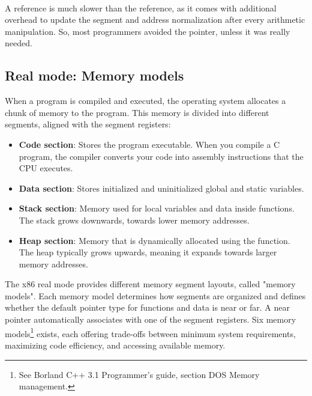 \documentclass[book.tex]{subfiles}
\begin{document}
\\

\par
A  reference is much slower than the  reference, as it comes with additional overhead to update the segment and address normalization after every arithmetic manipulation. So, most programmers avoided the  pointer, unless it was really needed.\\




\subsection{Real mode: Memory models}
When a program is compiled and executed, the operating system allocates a chunk of memory to the program. This memory is divided into different segments, aligned with the segment registers:
\begin{itemize}
  \item \textbf{Code section}: Stores the program executable. When you compile a C program, the compiler converts your code into assembly instructions that the CPU executes.
  \item \textbf{Data section}: Stores initialized and uninitialized global and static variables.
  \item \textbf{Stack section}: Memory used for local variables and data inside functions. The stack grows downwards, towards lower memory addresses.
  \item \textbf{Heap section}: Memory that is dynamically allocated using the  function. The heap typically grows upwards, meaning it expands towards larger memory addresses.
\end{itemize}

\par
The x86 real mode provides different memory segment layouts, called "memory models". Each memory model determines how segments are organized and defines whether the default pointer type for functions and data is near or far. A near pointer automatically associates with one of the segment registers. Six memory models\footnote{See Borland C++ 3.1 Programmer's guide, section DOS Memory management.} exists, each offering trade-offs between minimum system requirements, maximizing code efficiency, and accessing available memory.
\end{document}
